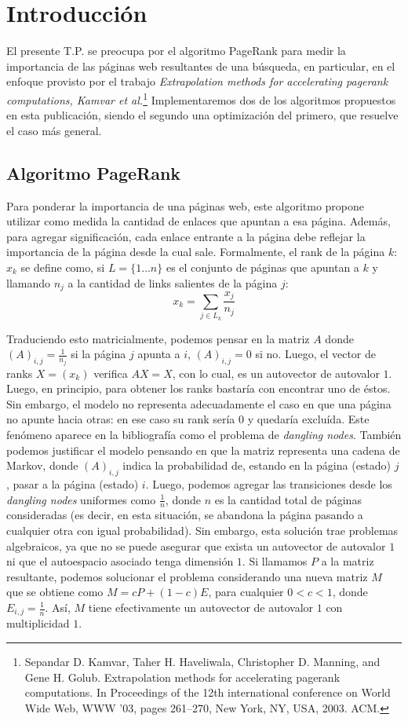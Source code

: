\section{Introducción}

El presente T.P. se preocupa por el algoritmo PageRank para medir la importancia de las páginas web resultantes de una búsqueda, en particular, en el enfoque provisto por el trabajo  
\emph{Extrapolation methods for accelerating pagerank computations, Kamvar et al.}\footnote{Sepandar D. Kamvar, Taher H. Haveliwala, Christopher D. Manning, and Gene H. Golub. Extrapolation methods for accelerating pagerank computations. In Proceedings of the 12th international conference on World Wide Web, WWW ’03, pages 261–270, New York, NY, USA, 2003. ACM.} Implementaremos dos de los algoritmos propuestos en esta publicación, siendo el segundo una optimización del primero, que resuelve el caso más general.

\subsection{Algoritmo PageRank}
Para ponderar la importancia de una páginas web, este algoritmo propone utilizar como medida la cantidad de enlaces que apuntan a esa página. Además, para agregar significación, cada enlace entrante a la página debe reflejar la importancia de la página desde la cual sale. Formalmente, el rank  de la página $k$: $x_k$ se define como, si $L = \{1\dots n\}$ es el conjunto de páginas que apuntan a $k$ y llamando $n_j$ a la cantidad de links salientes de la página $j$:
$$x_k = \displaystyle \sum_{j\in L_k} \frac{x_j}{n_j}$$

Traduciendo esto matricialmente, podemos pensar en la matriz $A$ donde $(A)_{i,j} = \frac{1}{n_j}$ si la página $j$ apunta a $i$, $(A)_{i,j} =0$ si no. Luego, el vector de ranks $X = (x_k)$ verifica $AX = X$, con lo cual, es un autovector de autovalor $1$. Luego, en principio, para obtener los ranks bastaría con encontrar uno de éstos. Sin embargo, el modelo no representa adecuadamente el caso en que una página no apunte hacia otras: en ese caso su rank sería $0$ y quedaría excluída. Este fenómeno aparece en la bibliografía como el problema de \emph{dangling nodes}. También podemos justificar el modelo pensando en que la matriz representa una cadena de Markov, donde $(A)_{i,j}$ indica la probabilidad de, estando en la página (estado) $j$, pasar a la página (estado) $i$. Luego, podemos agregar las transiciones desde los \emph{dangling nodes} uniformes como  $\frac{1}{n}$, donde $n$ es la cantidad total de páginas consideradas (es decir, en esta situación, se abandona la página pasando a cualquier otra con igual probabilidad). Sin embargo, esta solución trae problemas algebraicos, ya que no se puede asegurar que exista un autovector de autovalor $1$ ni que el autoespacio asociado tenga dimensión $1$.  
Si  llamamos $P$ a la matriz resultante, podemos solucionar el problema considerando una nueva matriz $M$ que se obtiene como $M = cP + (1-c)E$, para cualquier $0<c<1$, donde $E_{i,j} = \frac{1}{n}$. Así, $M$ tiene efectivamente un autovector de autovalor $1$ con multiplicidad $1$.

